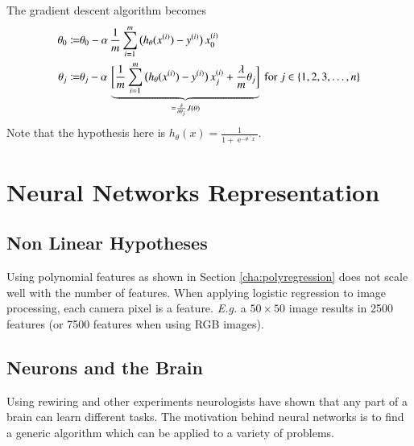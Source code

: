 \documentclass[a4paper,twoside,10pt]{article}
\begin{document}
The gradient descent algorithm becomes
\begin{align*}
  \begin{split}
    \theta_0\coloneqq&\theta_0-\alpha\,\frac{1}{m}\displaystyle\sum_{i=1}^m\big(h_\theta(x^{(i)})-y^{(i)}\big)\,x^{(i)}_0\\
    \theta_j\coloneqq&\theta_j-\alpha\,\underbrace{\bigg[\frac{1}{m}\displaystyle\sum_{i=1}^m\big(h_\theta(x^{(i)})-y^{(i)}\big)\,x^{(i)}_j+\frac{\lambda}{m}\theta_j\bigg]}_{=\frac{\delta}{\delta\theta_j}J(\theta)}
    \mathrm{\ for\ }j\in\{1,2,3,\ldots,n\}
  \end{split}
\end{align*}
Note that the hypothesis here is $h_\theta(x)=\frac{1}{1+\operatorname{e}^{-\theta^\top x}}$.

\section{Neural Networks Representation}
\subsection{Non Linear Hypotheses}
Using polynomial features as shown in Section \ref{cha:polyregression} does not scale well with the number of features.
When applying logistic regression to image processing, each camera pixel is a feature.
\emph{E.g.} a $50\times 50$ image results in 2500 features (or 7500 features when using RGB images).

\subsection{Neurons and the Brain}
Using rewiring and other experiments neurologists have shown that any part of a brain can learn different tasks.
The motivation behind neural networks is to find a generic algorithm which can be applied to a variety of problems.
\end{document}
